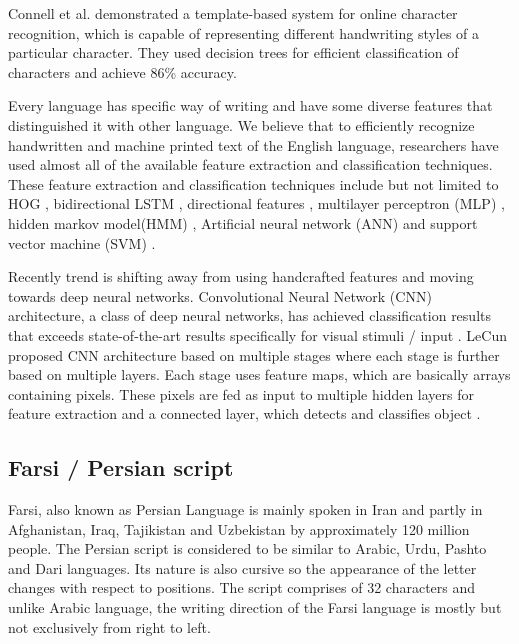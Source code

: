 \documentclass{article}
\begin{document}
Connell et al. \cite{connell2001template} demonstrated a template-based system for online character recognition, which is capable of representing different handwriting styles of a particular character. They used decision trees for efficient classification of characters and achieve 86\% accuracy. 


Every language has specific way of writing and have some diverse features that distinguished it with other language. We believe that to efficiently recognize handwritten and machine printed text of the English language, researchers have used almost all of the available feature extraction and classification techniques. These feature extraction and classification techniques include but not limited to HOG \cite{tian2016multilingual} , bidirectional LSTM \cite{toselli2016hmm}, directional features \cite{deshmukh2009analysis},  multilayer perceptron (MLP) \cite{ahlawat2017off,liu2002handwritten,sharma2013performance}, hidden markov model(HMM) \cite{zimmermann2002automatic,graves2008unconstrained,graves2009novel,pradeep2012neural}, Artificial neural network (ANN) \cite{patel2011handwritten,zhang2007novel,saha2013optical} and support vector machine (SVM) \cite{liu2005classification,vamvakas2010handwritten}. 

Recently trend is shifting away from using handcrafted features and moving towards deep neural networks. Convolutional Neural Network (CNN) architecture, a class of deep neural networks, has achieved classification results that exceeds state-of-the-art results specifically for visual stimuli / input \cite{avadesh2018optical}. LeCun \cite{DL} proposed CNN architecture based on multiple stages where each stage is further based on multiple layers. Each stage uses feature maps, which are basically arrays containing pixels. These pixels are fed as input to multiple hidden layers for feature extraction and a connected layer, which detects and classifies object \cite{KHAN201961}.  








\subsection{Farsi / Persian script}
Farsi, also known as Persian Language is mainly spoken in Iran and partly in Afghanistan, Iraq, Tajikistan and Uzbekistan by approximately 120 million people. The Persian script is considered to be similar to Arabic, Urdu, Pashto and Dari languages.  Its nature is also cursive so the appearance of the letter changes with respect to positions. The script comprises of 32 characters and unlike Arabic language, the writing direction of the Farsi language is mostly but not exclusively from right to left. 
\end{document}
